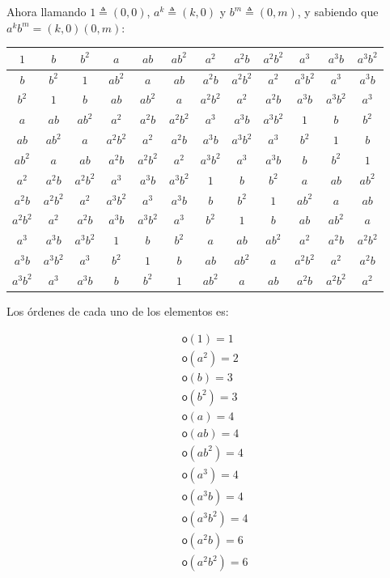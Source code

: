 \documentclass[12pt,a4paper,fleqn,spanish,final,openright]{extbook}
\theoremstyle{definition}
\theoremstyle{remark}
\begin{document}
Ahora llamando $1 \triangleq (0,0)$, $a^k \triangleq (k,0)$ y $b^m \triangleq (0,m)$, y sabiendo que $a^k b^m = (k,0)(0,m)$:
\\

\begin{flushleft}
\begin{tabular}{|c|c|c|c|c|c|c|c|c|c|c|c|}
\hline
 $1$ & $b$ & $b^2$ & $a$ & $ab$ & $ab^2$ & $a^2$ & $a^2b$ & $a^2b^2$ & $a^3$ & $a^3b$ & $a^3b^2$ \\
\hline
 $b$ & $b^2$ & $1$ & $ab^2$ & $a$ & $ab$ & $a^2b$ & $a^2b^2$ & $a^2$ & $a^3b^2$ & $a^3$ & $a^3b$ \\
\hline
 $b^2$ & $1$ & $b$ & $ab$ & $ab^2$ & $a$ & $a^2b^2$ & $a^2$ & $a^2b$ & $a^3b$ & $a^3b^2$ & $a^3$ \\
\hline
 $a$ & $ab$ & $ab^2$ & $a^2$ & $a^2b$ & $a^2b^2$ & $a^3$ & $a^3b$ & $a^3b^2$ & $1$ & $b$ & $b^2$ \\
\hline
 $ab$ & $ab^2$ & $a$ & $a^2b^2$ & $a^2$ & $a^2b$ & $a^3b$ & $a^3b^2$ & $a^3$ & $b^2$ & $1$ & $b$ \\
\hline
 $ab^2$ & $a$ & $ab$ & $a^2b$ & $a^2b^2$ & $a^2$ & $a^3b^2$ & $a^3$ & $a^3b$ & $b$ & $b^2$ & $1$ \\
\hline
 $a^2$ & $a^2b$ & $a^2b^2$ & $a^3$ & $a^3b$ & $a^3b^2$ & $1$ & $b$ & $b^2$ & $a$ & $ab$ & $ab^2$ \\
\hline
 $a^2b$ & $a^2b^2$ & $a^2$ & $a^3b^2$ & $a^3$ & $a^3b$ & $b$ & $b^2$ & $1$ & $ab^2$ & $a$ & $ab$ \\
\hline
 $a^2b^2$ & $a^2$ & $a^2b$ & $a^3b$ & $a^3b^2$ & $a^3$ & $b^2$ & $1$ & $b$ & $ab$ & $ab^2$ & $a$ \\
\hline
 $a^3$ & $a^3b$ & $a^3b^2$ & $1$ & $b$ & $b^2$ & $a$ & $ab$ & $ab^2$ & $a^2$ & $a^2b$ & $a^2b^2$ \\
\hline
 $a^3b$ & $a^3b^2$ & $a^3$ & $b^2$ & $1$ & $b$ & $ab$ & $ab^2$ & $a$ & $a^2b^2$ & $a^2$ & $a^2b$ \\
\hline
 $a^3b^2$ & $a^3$ & $a^3b$ & $b$ & $b^2$ & $1$ & $ab^2$ & $a$ & $ab$ & $a^2b$ & $a^2b^2$ & $a^2$ \\
\hline
\end{tabular}
\end{flushleft}

Los órdenes de cada uno de los elementos es:

\begin{align*}
&\mathsf{o}\left(1\right)=1\\
&\mathsf{o}\left(a^2\right)=2\\
&\mathsf{o}\left(b\right)=3\\
&\mathsf{o}\left(b^2\right)=3\\
&\mathsf{o}\left(a\right)=4\\
&\mathsf{o}\left(ab\right)=4\\
&\mathsf{o}\left(ab^2\right)=4\\
&\mathsf{o}\left(a^3\right)=4\\
&\mathsf{o}\left(a^3b\right)=4\\
&\mathsf{o}\left(a^3b^2\right)=4\\
&\mathsf{o}\left(a^2b\right)=6\\
&\mathsf{o}\left(a^2b^2\right)=6
\end{align*}
\end{document}
